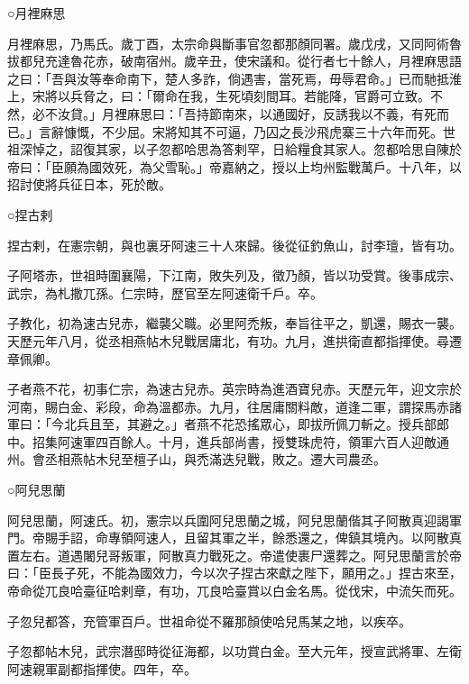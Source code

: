\begin{pinyinscope}
 ○月裡麻思



 月裡麻思，乃馬氏。歲丁酉，太宗命與斷事官忽都那顏同署。歲戊戌，又同阿術魯拔都兒充達魯花赤，破南宿州。歲辛丑，使宋議和。從行者七十餘人，月裡麻思語之曰：「吾與汝等奉命南下，楚人多詐，倘遇害，當死焉，毋辱君命。」已而馳抵淮上，宋將以兵脅之，曰：「爾命在我，生死頃刻間耳。若能降，官爵可立致。不然，必不汝貸。」月裡麻思曰：「吾持節南來，以通國好，反誘我以不義，有死而已。」言辭慷慨，不少屈。宋將知其不可逼，乃囚之長沙飛虎寨三十六年而死。世祖深悼之，詔復其家，以子忽都哈思為答剌罕，日給糧食其家人。忽都哈思自陳於帝曰：「臣願為國效死，為父雪恥。」帝嘉納之，授以上均州監戰萬戶。十八年，以招討使將兵征日本，死於敵。



 ○捏古剌



 捏古剌，在憲宗朝，與也裏牙阿速三十人來歸。後從征釣魚山，討李璮，皆有功。



 子阿塔赤，世祖時圍襄陽，下江南，敗失列及，徵乃顏，皆以功受賞。後事成宗、武宗，為札撒兀孫。仁宗時，歷官至左阿速衛千戶。卒。



 子教化，初為速古兒赤，繼襲父職。必里阿禿叛，奉旨往平之，凱還，賜衣一襲。天歷元年八月，從丞相燕帖木兒戰居庸北，有功。九月，進拱衛直都指揮使。尋遷章佩卿。



 子者燕不花，初事仁宗，為速古兒赤。英宗時為進酒寶兒赤。天歷元年，迎文宗於河南，賜白金、彩段，命為溫都赤。九月，往居庸關料敵，道逢二軍，謂探馬赤諸軍曰：「今北兵且至，其避之。」者燕不花恐搖眾心，即拔所佩刀斬之。授兵部郎中。招集阿速軍四百餘人。十月，進兵部尚書，授雙珠虎符，領軍六百人迎敵通州。會丞相燕帖木兒至檀子山，與禿滿迭兒戰，敗之。遷大司農丞。



 ○阿兒思蘭



 阿兒思蘭，阿速氏。初，憲宗以兵圍阿兒思蘭之城，阿兒思蘭偕其子阿散真迎謁軍門。帝賜手詔，命專領阿速人，且留其軍之半，餘悉還之，俾鎮其境內。以阿散真置左右。道遇闍兒哥叛軍，阿散真力戰死之。帝遣使裹尸還葬之。阿兒思蘭言於帝曰：「臣長子死，不能為國效力，今以次子捏古來獻之陛下，願用之。」捏古來至，帝命從兀良哈臺征哈剌章，有功，兀良哈臺賞以白金名馬。從伐宋，中流矢而死。



 子忽兒都答，充管軍百戶。世祖命從不羅那顏使哈兒馬某之地，以疾卒。



 子忽都帖木兒，武宗潛邸時從征海都，以功賞白金。至大元年，授宣武將軍、左衛阿速親軍副都指揮使。四年，卒。




\end{pinyinscope}
